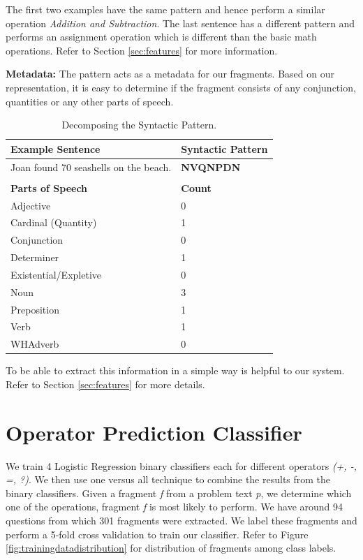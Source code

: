 \documentclass[11pt]{article}
\begin{document}
The first two examples have the same pattern and hence perform a similar operation \textit{Addition and Subtraction}. The last sentence has a different pattern and performs an assignment operation which is different than the basic math operations. Refer to Section \ref{sec:features} for more information.

\textbf{Metadata:} The pattern acts as a metadata for our fragments. Based on our representation, it is easy to determine if the fragment consists of any conjunction, quantities or any other parts of speech. 
\begin{table}[h!]
\centering
\begin{tabular}{ | m{20em} | m{6em} |}
\hline
\textbf{Example Sentence} & \textbf{Syntactic Pattern}\\
\hline
Joan found 70 seashells on the beach. &  \textbf{NVQNPDN} \\
\hline
 & \\
\hline
\textbf{Parts of Speech} & \textbf{Count}\\
\hline
Adjective & 0 \\
\hline
Cardinal (Quantity) & 1\\
\hline
Conjunction & 0\\
\hline
Determiner & 1\\
\hline
Existential/Expletive & 0\\
\hline
Noun & 3\\
\hline
Preposition & 1\\
\hline
Verb & 1\\
\hline
WHAdverb & 0\\
\hline
\end{tabular}
\caption{Decomposing the Syntactic Pattern.}
\label{metadata}
\end{table}

 To be able to extract this information in a simple way is helpful to our system. Refer to Section \ref{sec:features} for more details.

\section {Operator Prediction Classifier}\label{sec:predictionclassifier}
We train 4 Logistic Regression binary classifiers each for different operators \textit{(+, -, =, ?)}. We then use one versus all technique to combine the results from the binary classifiers. Given a fragment \textit{f} from a problem text \textit{p}, we determine which one of the operations, fragment \textit{f} is most likely to perform. We have around 94 questions from which 301 fragments were extracted. We label these fragments and perform a 5-fold cross validation to train our classifier. Refer to Figure \ref{fig:trainingdatadistribution} for distribution of fragments among class labels.
\end{document}
